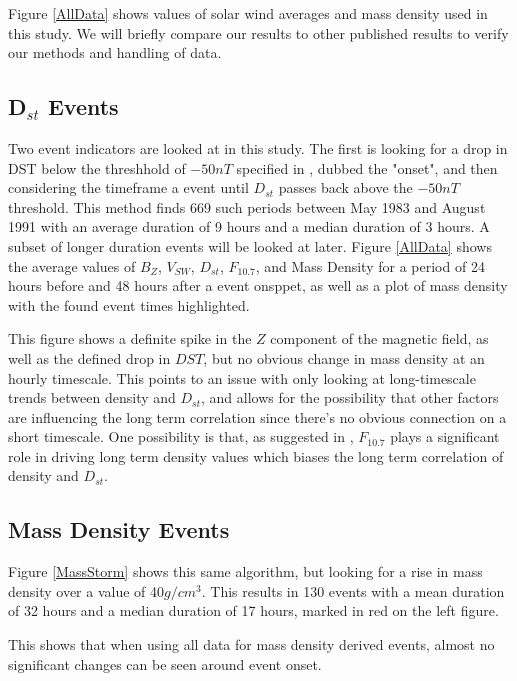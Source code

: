 \documentclass[10pt,twocolumn]{article}
\begin{document}
Figure \ref{AllData} shows values of solar wind averages and mass density used in this study. We will briefly compare our results to other published results to verify our methods and handling of data. 

\subsection{D$_{st}$ Events}
Two event indicators are looked at in this study. The first is looking for a drop in DST below the threshhold of $-50nT$ specified in \cite{Takahashi2010}, dubbed the "onset", and then considering the timeframe a event until $D_{st}$ passes back above the $-50nT$ threshold. This method finds 669 such periods between May 1983 and August 1991 with an average duration of 9 hours and a median duration of 3 hours. A subset of longer duration events will be looked at later. Figure \ref{AllData} shows the average values of $B_Z$, $V_{SW}$, $D_{st}$, $F_{10.7}$, and Mass Density for a period of 24 hours before and 48 hours after a event onsppet, as well as a plot of mass density with the found event times highlighted.

This figure shows a definite spike in the $Z$ component of the magnetic field, as well as the defined drop in $DST$, but no obvious change in mass density at an hourly timescale. This points to an issue with only looking at long-timescale trends between density and $D_{st}$, and allows for the possibility that other factors are influencing the long term correlation since there's no obvious connection on a short timescale. One possibility is that, as suggested in \cite{Takahashi2010}, $F_{10.7}$ plays a significant role in driving long term density values which biases the long term correlation of density and $D_{st}$.

\subsection{Mass Density Events}
Figure \ref{MassStorm} shows this same algorithm, but looking for a rise in mass density over a value of 40$g/cm^3$. This results in 130 events with a mean duration of 32 hours and a median duration of 17 hours, marked in red on the left figure.



This shows that when using all data for mass density derived events, almost no significant changes can be seen around event onset.
\end{document}
